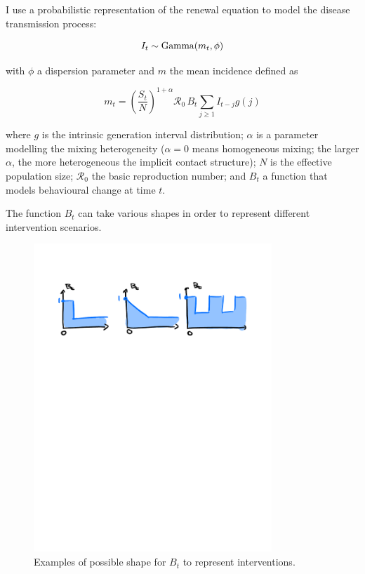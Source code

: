 \documentclass[12pt]{article}
\newcommand{\Ro}{\mathcal{R}_0}
\newcommand{\gam}{\mathrm{Gamma}}
\begin{document}
I use a probabilistic representation of the renewal equation to model the disease transmission process:

\begin{equation}
I_t  \sim \gam (m_t , \phi) \\
\end{equation}

with $\phi$ a dispersion parameter and $m$ the mean incidence defined as 

\begin{equation}
m_t  =  \left( \frac{S_t}{N}  \right)^{1+\alpha} \Ro \, B_t \sum_{j\geq 1} I_{t-j}g(j)
\label{eq:renewal}
\end{equation}


where $g$ is the intrinsic generation interval distribution; $\alpha$ is a parameter modelling the mixing heterogeneity ($\alpha=0$ means homogeneous mixing; the larger $\alpha$, the more heterogeneous the implicit contact structure); $N$ is the effective population size; $\Ro$ the basic reproduction number; and $B_t$ a function  that models behavioural change at time $t$.

The function $B_t$ can take various shapes in order to represent different intervention scenarios. 
\begin{figure}[htbp]
\begin{center}
\includegraphics[width = 0.8\textwidth]{Bt.pdf}
\caption{Examples of possible shape for $B_t$ to represent interventions.}
\label{fig:Bt}
\end{center}
\end{figure}
\end{document}
